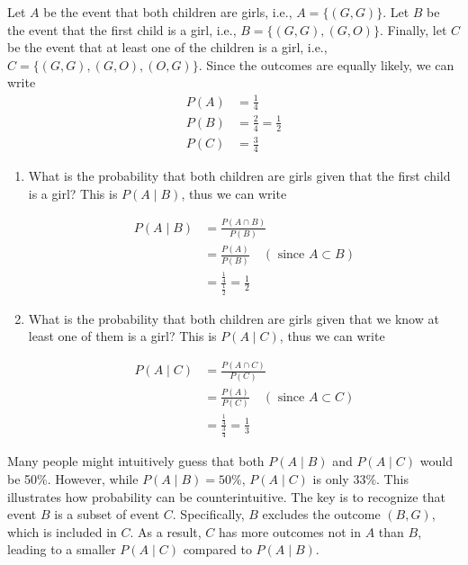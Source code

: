 \begin{solution}
    Let $A$ be the event that both children are girls, i.e., $A=\{(G, G)\}$. Let $B$ be the event that the first child is a girl, i.e., $B=\{(G, G),(G, O)\}$. Finally, let $C$ be the event that at least one of the children is a girl, i.e., $C=\{(G, G),(G, O),(O, G)\}$. Since the outcomes are equally likely, we can write
    \begin{align*}
    P(A) &= \frac{1}{4} \\
    P(B) &= \frac{2}{4} = \frac{1}{2} \\
    P(C) &= \frac{3}{4}
    \end{align*}


    \begin{enumerate}[label=(\alph*)]
         \item What is the probability that both children are girls given that the first child is a girl? This is $P(A \mid B)$, thus we can write

                    \begin{align*}
                    P(A \mid B) & =\frac{P(A \cap B)}{P(B)} \\
                    & =\frac{P(A)}{P(B)} \quad(\text { since } A \subset B) \\
                    & =\frac{\frac{1}{4}}{\frac{1}{2}}=\frac{1}{2}
                    \end{align*}
                
                \item What is the probability that both children are girls given that we know at least one of them is a girl? This is $P(A \mid C)$, thus we can write

                    \begin{align*}
                    P(A \mid C) & =\frac{P(A \cap C)}{P(C)} \\
                    & =\frac{P(A)}{P(C)} \quad(\text { since } A \subset C) \\
                    & =\frac{\frac{1}{4}}{\frac{3}{4}}=\frac{1}{3}
                    \end{align*}
        
    \end{enumerate}
\end{solution}

\begin{remark}
    Many people might intuitively guess that both \( P(A \mid B) \) and \( P(A \mid C) \) would be 50\%. However, while \( P(A \mid B) = 50\%\), \( P(A \mid C) \) is only 33\%. This illustrates how probability can be counterintuitive. The key is to recognize that event \( B \) is a subset of event \( C \). Specifically, \( B \) excludes the outcome \( (B, G) \), which is included in \( C \). As a result, \( C \) has more outcomes not in \( A \) than \( B \), leading to a smaller \( P(A \mid C) \) compared to \( P(A \mid B) \).
\end{remark}


